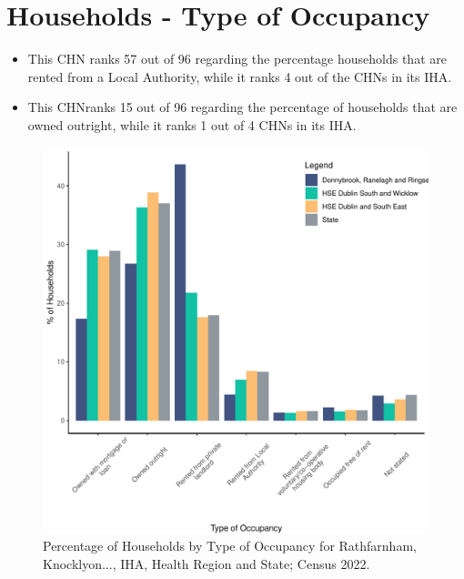 \documentclass{article}
\begin{document}
\section{Households - Type of Occupancy}\label{sect:Households}
\begin{itemize}
\item This CHN ranks  57 out of 96 regarding the percentage households that are rented from a Local Authority, while it ranks  4 out of the CHNs in its IHA. 
\item This CHNranks  15 out of 96 regarding the percentage of households that are owned outright, while it ranks   1 out of 4 CHNs in its IHA.
\end{itemize}
\begin{figure}[H]
	\centering
	\includegraphics[width = 140mm]{../figures/HouseholdsED.pdf}
	\caption{Percentage of Households by Type of Occupancy for Rathfarnham, Knocklyon..., IHA, Health Region and State; Census 2022.}
	\label{fig:vbnv}
	\end{figure}
\end{document}
